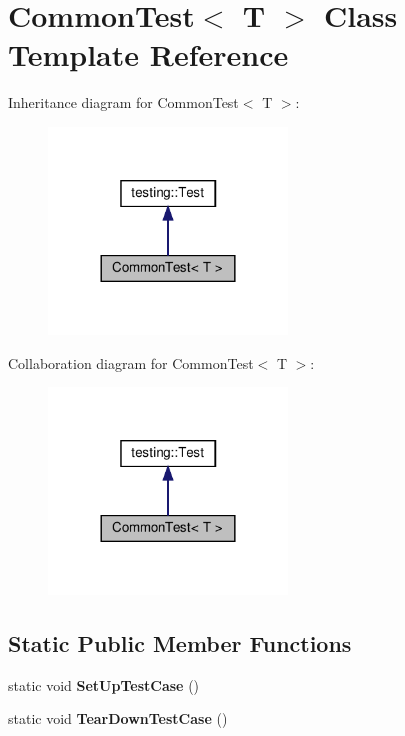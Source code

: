 \hypertarget{class_common_test}{}\section{Common\+Test$<$ T $>$ Class Template Reference}
\label{class_common_test}


Inheritance diagram for Common\+Test$<$ T $>$\+:
\nopagebreak
\begin{figure}[H]
\begin{center}
\leavevmode
\includegraphics[width=180pt]{class_common_test__inherit__graph}
\end{center}
\end{figure}


Collaboration diagram for Common\+Test$<$ T $>$\+:
\nopagebreak
\begin{figure}[H]
\begin{center}
\leavevmode
\includegraphics[width=180pt]{class_common_test__coll__graph}
\end{center}
\end{figure}
\subsection*{Static Public Member Functions}
\begin{DoxyCompactItemize}
\item 
\mbox{\label{class_common_test_a6edd90f32f45cc49e4a423b22bd770ce}} 
static void {\bfseries Set\+Up\+Test\+Case} ()
\item 
\mbox{\label{class_common_test_a68d2bf5108cf28478331588fbdff4838}} 
static void {\bfseries Tear\+Down\+Test\+Case} ()
\end{DoxyCompactItemize}
